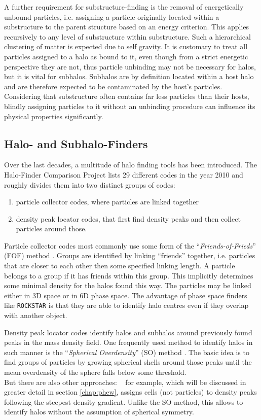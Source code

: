 A further requirement for substructure-finding is the removal of energetically unbound particles, i.e. assigning a particle originally located within a substructure to the parent structure based on an energy criterion. 
This applies recursively to any level of substructure within substructure. 
Such a hierarchical clustering of matter is expected due to self gravity.
It is customary to treat all particles assigned to a halo as bound to it, even though from a strict energetic perspective they are not, thus particle unbinding may not be necessary for halos, but it is vital for subhalos. 
Subhalos are by definition located within a host halo and are therefore expected to be contaminated by the host's particles.
Considering that substructure often contains far less particles than their hosts, blindly assigning particles to it without an unbinding procedure can influence its physical properties significantly. 





\subsection{Halo- and Subhalo-Finders}

Over the last decades, a multitude of halo finding tools has been introduced.
The Halo-Finder Comparison Project \parencite{MAD} lists 29 different codes in the year 2010 and roughly divides them into two distinct groups of codes:
%
\begin{enumerate}
	\item particle collector codes, where particles are linked together
	\item density peak locator codes, that first find density peaks and then collect particles around those.
\end{enumerate}
%
Particle collector codes most commonly use some form of the ``\emph{Friends-of-Frieds}'' (FOF) method \parencite{FOF}.
Groups are identified by linking ``friends'' together, i.e. particles that are closer to each other then some specified linking length.
A particle belongs to a group if it has friends within this group. 
This implicitly determines some minimal density for the halos found this way.
The particles may be linked either in 3D space or in 6D phase space.
The advantage of phase space finders like \texttt{ROCKSTAR} \parencite{rockstar} is that they are able to identify halo centres even if they overlap with another object.

Density peak locator codes identify halos and subhalos around previously found peaks in the mass density field.
One frequently used method to identify halos in such manner is the ``\emph{Spherical Overdensity}'' (SO) method \parencite{SO}. 
The basic idea is to find groups of particles by growing spherical shells around those peaks until the mean overdensity of the sphere falls below some threshold.\\
But there are also other approaches: \phew\ \parencite{PHEW} for example, which will be discussed in greater detail in section \ref{chap:phew}, assigns cells (not particles) to density peaks following the steepest density gradient.
Unlike the SO method, this allows to identify halos without the assumption of spherical symmetry.


